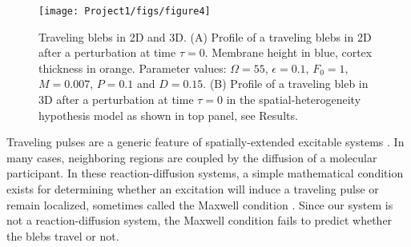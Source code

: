 \begin{figure}
   \begin{center}
   \captionsetup{width=17cm}
     \texttt{[image: Project1/figs/figure4]}
      \caption{Traveling blebs in 2D and 3D. (A) Profile of a traveling blebs in 2D after a perturbation at time $\tau =0$. Membrane height in blue,  cortex thickness in orange. Parameter values: $\Omega = 55$, $\epsilon = 0.1$, $F_0 = 1$, $M = 0.007$, $P = 0.1$ and $D = 0.15$. (B) Profile of a traveling bleb in 3D after a perturbation at time $\tau =0$ in the spatial-heterogeneity hypothesis model as shown in top panel, see Results.}
      \label{fig::travel}
   \end{center}
\end{figure}

Traveling pulses are a generic feature of spatially-extended excitable systems \cite{Idema:2013ig, Ryan:2012bq, bement2015activator}. In many cases, neighboring regions are coupled by the diffusion of a molecular participant. In these reaction-diffusion systems, a simple mathematical condition exists for determining whether an excitation will induce a traveling pulse or remain localized, sometimes called the Maxwell condition \cite{Anonymous:OS1MPwCl,Mori:2008hj}. Since our system is not a reaction-diffusion system, the Maxwell condition fails to predict whether the blebs travel or not. 

